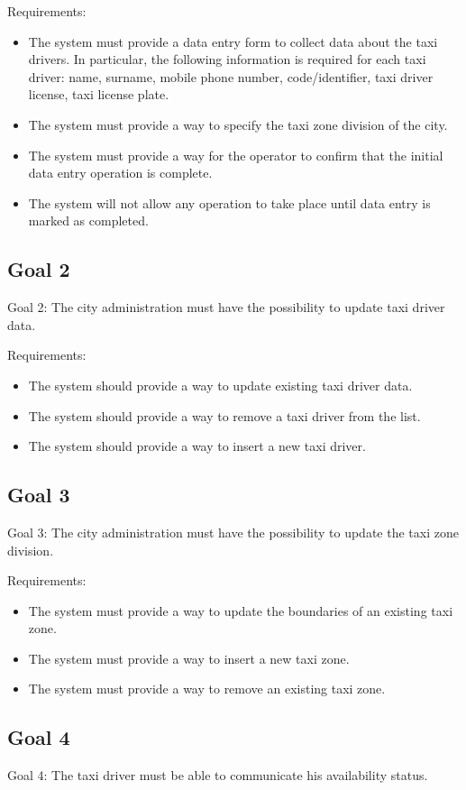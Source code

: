 \documentclass{book}
\begin{document}
Requirements:
\begin{itemize}
\item The system must provide a data entry form to collect data about the taxi drivers. In particular, the following information is required for each taxi driver: name, surname, mobile phone number, code/identifier, taxi driver license, taxi license plate.
\item The system must provide a way to specify the taxi zone division of the city. 
\item The system must provide a way for the operator to confirm that the initial data entry operation is complete. 
\item The system will not allow any operation to take place until data entry is marked as completed. 
\end{itemize}

\subsection{Goal 2}
Goal 2: The city administration must have the possibility to update taxi driver data.

Requirements:
\begin{itemize}
\item The system should provide a way to update existing taxi driver data. 
\item The system should provide a way to remove a taxi driver from the list.
\item The system should provide a way to insert a new taxi driver.
\end{itemize}

\subsection{Goal 3}
Goal 3: The city administration must have the possibility to update the taxi zone division.

Requirements:
\begin{itemize}
\item The system must provide a way to update the boundaries of an existing taxi zone. 
\item The system must provide a way to insert a new taxi zone.
\item The system must provide a way to remove an existing taxi zone.
\end{itemize}

\subsection{Goal 4}
Goal 4: The taxi driver must be able to communicate his availability status.
\end{document}
